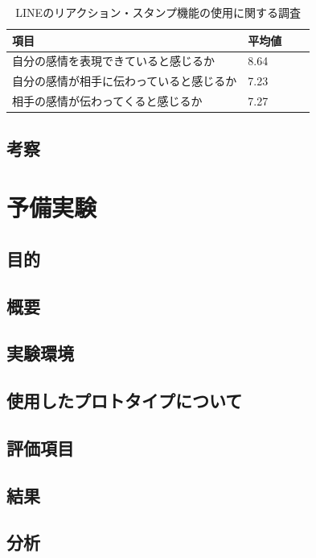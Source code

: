 \documentclass[11pt,a4paper]{ltjsreport}
\newcommand{\bhline}{\noalign{\hrule height 1.2pt}} %
\begin{document}
\vspace{\baselineskip} %
\begin{table}[!ph]
    \caption{LINEのリアクション・スタンプ機能の使用に関する調査}
    \label{table:Yobi_tyousa}
    \vspace{5mm}
    \centering
    \begin{tabular}{llll}
        \bhline
        項目                   & 平均値  \\
        \hline
        自分の感情を表現できていると感じるか   & 8.64 \\
        自分の感情が相手に伝わっていると感じるか & 7.23 \\
        相手の感情が伝わってくると感じるか    & 7.27 \\
        \hline
    \end{tabular}
\end{table}

\subsection{考察}

\section{予備実験}
\subsection{目的}
\subsection{概要}
\subsection{実験環境}
\subsection{使用したプロトタイプについて}
\subsection{評価項目}
\subsection{結果}
\subsection{分析}
\end{document}
